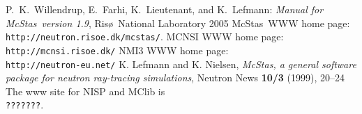 \documentclass[twoside,notitlepage,11pt]{report}
\newcommand{\MCS}{{McStas}}
\begin{document}
\begin{thebibliography}{99}
 P.~K.~Willendrup, E.~Farhi, K.~Lieutenant, and
K.~Lefmann: \textit{Manual for \MCS\ version 1.9}, 
Ris\o\ National Laboratory 2005
 \MCS\ WWW home page: \\
   \indent\verb+http://neutron.risoe.dk/mcstas/+.
 MCNSI WWW home page: \\
   \indent\verb+http://mcnsi.risoe.dk/+
 NMI3 WWW home page: \\
   \indent\verb+http://neutron-eu.net/+
 K. Lefmann and K. Nielsen, 
{\em McStas, a general software package for neutron ray-tracing simulations},
Neutron News \textbf{10/3} (1999), 20--24
 The www site for NISP and MClib is \\
  \indent\verb+???????+.
\end{thebibliography}

\printindex

\end{document}
